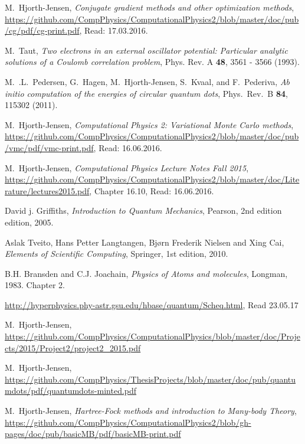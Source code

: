 \documentclass[../main.tex]{subfiles}
\begin{document}
\begin{thebibliography}{99}

 M.~Hjorth-Jensen, {\em Conjugate gradient methods and other optimization methods},  \url{https://github.com/CompPhysics/ComputationalPhysics2/blob/master/doc/pub/cg/pdf/cg-print.pdf}, Read: 17.03.2016.

 M.~Taut, \emph{Two electrons in an external oscillator potential: Particular analytic solutions
of a Coulomb correlation problem}, Phys. Rev. A {\bf 48}, 3561 - 3566 (1993).

 M.~.L.~Pedersen, G.~Hagen, M.~Hjorth-Jensen, S.~Kvaal,  and F.~Pederiva, \emph{Ab initio computation of the energies of circular quantum dots}, Phys.~Rev.~B {\bf 84}, 115302 (2011).

 M.~Hjorth-Jensen, \emph{Computational Physics 2: Variational Monte Carlo methods}, \url{https://github.com/CompPhysics/ComputationalPhysics2/blob/master/doc/pub/vmc/pdf/vmc-print.pdf}, Read: 16.06.2016.

 M.~Hjorth-Jensen, \emph{Computational Physics Lecture Notes Fall 2015},  \url{https://github.com/CompPhysics/ComputationalPhysics2/blob/master/doc/Literature/lectures2015.pdf}, Chapter 16.10, Read: 16.06.2016.

 David j. Griffiths, \emph{Introduction to Quantum Mechanics}, Pearson,
2nd edition edition, 2005.

 Aslak Tveito, Hans Petter Langtangen, Bjørn Frederik Nielsen and Xing Cai, \emph{Elements of Scientific Computing}, Springer, 1st edition, 2010.

 B.H. Bransden and C.J. Joachain, \emph{Physics of Atoms and molecules}, Longman, 1983. Chapter
2.

 \url{http://hyperphysics.phy-astr.gsu.edu/hbase/quantum/Scheq.html}, Read 23.05.17

 M.~Hjorth-Jensen, \url{https://github.com/CompPhysics/ComputationalPhysics/blob/master/doc/Projects/2015/Project2/project2_2015.pdf}

 M.~Hjorth-Jensen, \url{https://github.com/CompPhysics/ThesisProjects/blob/master/doc/pub/quantumdots/pdf/quantumdots-minted.pdf}

 M.~Hjorth-Jensen, \emph{Hartree-Fock methods and introduction to Many-body Theory}, \url{https://github.com/CompPhysics/ComputationalPhysics2/blob/gh-pages/doc/pub/basicMB/pdf/basicMB-print.pdf}


\end{thebibliography}
\end{document}
